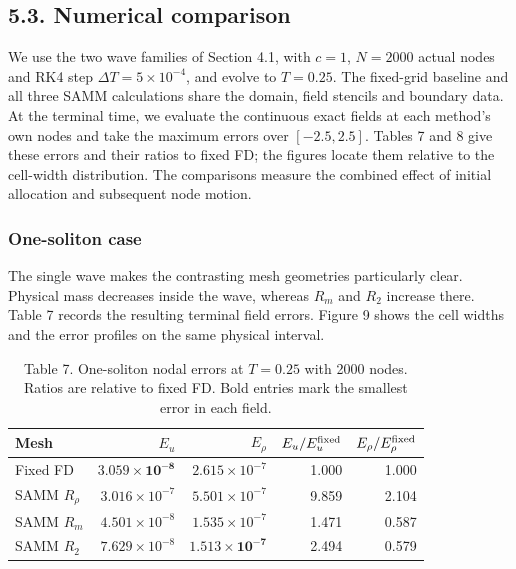 \documentclass[11pt,a4paper]{article}
\begin{document}
\subsection*{5.3. Numerical comparison}

We use the two wave families of Section 4.1, with \(c=1\), \(N=2000\) actual nodes and RK4 step \(\Delta T=5\times10^{-4}\), and evolve to \(T=0.25\). The fixed-grid baseline and all three SAMM calculations share the domain, field stencils and boundary data. At the terminal time, we evaluate the continuous exact fields at each method's own nodes and take the maximum errors over \([-2.5,2.5]\). Tables 7 and 8 give these errors and their ratios to fixed FD; the figures locate them relative to the cell-width distribution. The comparisons measure the combined effect of initial allocation and subsequent node motion.

\subsubsection*{One-soliton case}

The single wave makes the contrasting mesh geometries particularly clear. Physical mass decreases inside the wave, whereas \(R_m\) and \(R_2\) increase there. Table 7 records the resulting terminal field errors. Figure 9 shows the cell widths and the error profiles on the same physical interval.

\begin{table}[!htbp]
\centering
\caption*{Table 7. One-soliton nodal errors at $T=0.25$ with 2000 nodes. Ratios are relative to fixed FD. Bold entries mark the smallest error in each field.}
\small\setlength{\tabcolsep}{5pt}\renewcommand{\arraystretch}{1.2}
\begin{tabular}{lrrrr}
\toprule
Mesh & $E_u$ & $E_\rho$ & $E_u/E_u^{\rm fixed}$ & $E_\rho/E_\rho^{\rm fixed}$ \\
\midrule
Fixed FD & $\mathbf{3.059\times10^{-8}}$ & $2.615\times10^{-7}$ & 1.000 & 1.000 \\
SAMM $R_\rho$ & $3.016\times10^{-7}$ & $5.501\times10^{-7}$ & 9.859 & 2.104 \\
SAMM $R_m$ & $4.501\times10^{-8}$ & $1.535\times10^{-7}$ & 1.471 & 0.587 \\
SAMM $R_2$ & $7.629\times10^{-8}$ & $\mathbf{1.513\times10^{-7}}$ & 2.494 & 0.579 \\
\bottomrule
\end{tabular}
\end{table}
\end{document}
